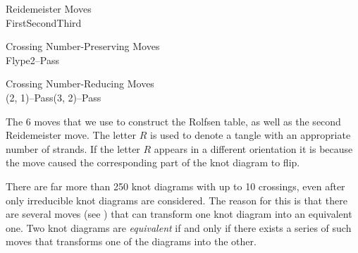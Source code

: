 \begin{paper}
\begin{center}\begin{minipage}{\columnwidth}\begin{center}
Reidemeister Moves\vspace{0.5em}
\\\vspace{0.5em}
First\hspace{0.19\columnwidth}Second\hspace{0.17\columnwidth}Third\\\vspace{1em}
\end{center}\end{minipage}\end{center}
\begin{center}\begin{minipage}{\columnwidth}\begin{center}
Crossing Number-Preserving Moves\vspace{0.5em}
\\\vspace{0.5em}
Flype\hspace{0.3\columnwidth}2--Pass\\\vspace{1em}
\end{center}\end{minipage}\end{center}
\begin{center}\begin{minipage}{\columnwidth}\begin{center}
Crossing Number-Reducing Moves\vspace{0.5em}
\\\vspace{0.5em}
(2, 1)--Pass\hspace{0.2\columnwidth}(3, 2)--Pass
\end{center}\end{minipage}\end{center}

{The 6 moves that we use to construct the Rolfsen table, as well as the second
Reidemeister move.
The letter $R$ is used to denote a tangle with an appropriate number of strands.
If the letter $R$ appears in a different orientation it is because the move
caused the corresponding part of the knot diagram to flip.}

There are far more than 250 knot diagrams with up to 10 crossings, even after
only irreducible knot diagrams are considered.
The reason for this is that there are several moves (see \figMoves) that can
transform one knot diagram into an equivalent one.
Two knot diagrams are \textit{equivalent} if and only if there exists a series
of such moves that transforms one of the diagrams into the other.\\


\end{paper}
